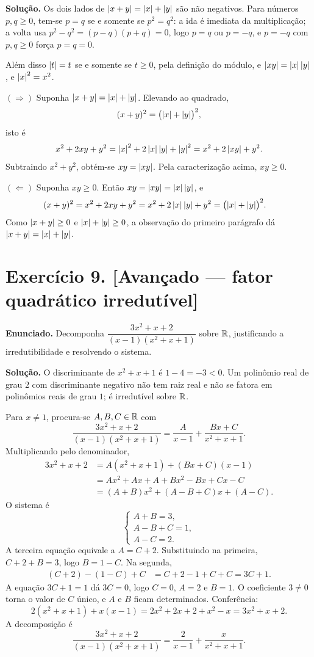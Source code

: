\documentclass[11pt,a4paper]{article}
\begin{document}
\textbf{Solução.}
Os dois lados de $\left\lvert x+y \right\rvert=\left\lvert x \right\rvert+\left\lvert y \right\rvert$ são não negativos. Para números $p,q\ge 0$, tem-se $p=q$ se e somente se $p^2=q^2$: a ida é imediata da multiplicação; a volta usa $p^2-q^2=(p-q)(p+q)=0$, logo $p=q$ ou $p=-q$, e $p=-q$ com $p,q\ge 0$ força $p=q=0$.

Além disso $\left\lvert t \right\rvert=t$ se e somente se $t\ge 0$, pela definição do módulo, e $\left\lvert xy \right\rvert=\left\lvert x \right\rvert\left\lvert y \right\rvert$, e $\left\lvert x \right\rvert^2=x^2$.

$(\Rightarrow)$ Suponha $\left\lvert x+y \right\rvert=\left\lvert x \right\rvert+\left\lvert y \right\rvert$. Elevando ao quadrado,
\[
(x+y)^2=\bigl(\left\lvert x \right\rvert+\left\lvert y \right\rvert\bigr)^2,
\]
isto é
\[
x^2+2xy+y^2=\left\lvert x \right\rvert^2+2\left\lvert x \right\rvert\left\lvert y \right\rvert+\left\lvert y \right\rvert^2=x^2+2\left\lvert xy \right\rvert+y^2.
\]
Subtraindo $x^2+y^2$, obtém-se $xy=\left\lvert xy \right\rvert$. Pela caracterização acima, $xy\ge 0$.

$(\Leftarrow)$ Suponha $xy\ge 0$. Então $xy=\left\lvert xy \right\rvert=\left\lvert x \right\rvert\left\lvert y \right\rvert$, e
\begin{align*}
(x+y)^2
&=x^2+2xy+y^2
=x^2+2\left\lvert x \right\rvert\left\lvert y \right\rvert+y^2
=\bigl(\left\lvert x \right\rvert+\left\lvert y \right\rvert\bigr)^2.
\end{align*}
Como $\left\lvert x+y \right\rvert\ge 0$ e $\left\lvert x \right\rvert+\left\lvert y \right\rvert\ge 0$, a observação do primeiro parágrafo dá $\left\lvert x+y \right\rvert=\left\lvert x \right\rvert+\left\lvert y \right\rvert$.

\section*{Exercício 9. [Avançado --- fator quadrático irredutível]}

\textbf{Enunciado.} Decomponha $\dfrac{3x^2+x+2}{(x-1)(x^2+x+1)}$ sobre $\mathbb{R}$, justificando a irredutibilidade e resolvendo o sistema.

\textbf{Solução.}
O discriminante de $x^2+x+1$ é $1-4=-3<0$. Um polinômio real de grau $2$ com discriminante negativo não tem raiz real e não se fatora em polinômios reais de grau $1$; é irredutível sobre $\mathbb{R}$.

Para $x\neq 1$, procura-se $A,B,C\in\mathbb{R}$ com
\[
\frac{3x^2+x+2}{(x-1)(x^2+x+1)}=\frac{A}{x-1}+\frac{Bx+C}{x^2+x+1}.
\]
Multiplicando pelo denominador,
\begin{align*}
3x^2+x+2
&=A(x^2+x+1)+(Bx+C)(x-1)\\
&=Ax^2+Ax+A+Bx^2-Bx+Cx-C\\
&=(A+B)x^2+(A-B+C)x+(A-C).
\end{align*}
O sistema é
\[
\begin{cases}
A+B=3,\\
A-B+C=1,\\
A-C=2.
\end{cases}
\]
A terceira equação equivale a $A=C+2$. Substituindo na primeira, $C+2+B=3$, logo $B=1-C$. Na segunda,
\begin{align*}
(C+2)-(1-C)+C
&=C+2-1+C+C
=3C+1.
\end{align*}
A equação $3C+1=1$ dá $3C=0$, logo $C=0$, $A=2$ e $B=1$. O coeficiente $3\neq 0$ torna o valor de $C$ único, e $A$ e $B$ ficam determinados. Conferência:
\[
2(x^2+x+1)+x(x-1)=2x^2+2x+2+x^2-x=3x^2+x+2.
\]
A decomposição é
\[
\frac{3x^2+x+2}{(x-1)(x^2+x+1)}=\frac{2}{x-1}+\frac{x}{x^2+x+1}.
\]
\end{document}
